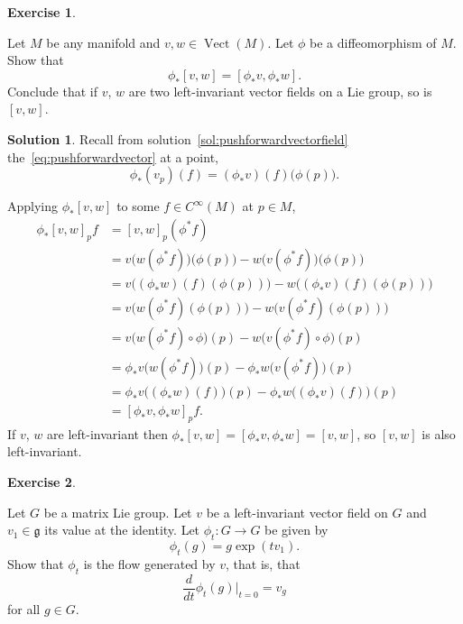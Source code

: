\documentclass[11pt, a4paper]{report}
\theoremstyle{definition}
\newtheorem{exercise}{Exercise}[part]
\newtheorem{solution}{Solution}[part]
\newenvironment{ex}{\begin{exercise}}{\end{exercise}\pagebreak[1]}
\newenvironment{sol}{\begin{solution}}{\end{solution}\pagebreak[3]}
\DeclareMathOperator{\Vect}{Vect}
\begin{document}
\begin{ex}\label{ex:pushforwardliebracket}

Let $M$ be any manifold and $v, w \in \Vect(M)$. Let $\phi$ be a diffeomorphism of $M$. Show that
\[
    \phi_* [v, w] = [\phi_* v, \phi_* w].
\]
Conclude that if $v$, $w$ are two left-invariant vector fields on a Lie group, so is $[v, w]$.

\end{ex}

\begin{sol}

Recall from solution~\ref{sol:pushforwardvectorfield} the~\ref{eq:pushforwardvector} at a point,
\[
    \phi_* (v_p) (f) = (\phi_* v)(f) \bigl(\phi(p)\bigr).
\]

Applying $\phi_* [v, w]$ to some $f \in C^\infty(M)$ at $p \in M$,
\begin{align*}
    \phi_* {[v, w]}_p f &= {[v, w]}_p (\phi^* f) \\
        &= v \bigl(w (\phi^* f) \bigr) \bigl(\phi(p)\bigr)
           - w \bigl(v (\phi^* f) \bigr) \bigl(\phi(p)\bigr) \\
        &= v \bigl( (\phi_* w) (f) (\phi(p)) \bigr)
           - w \bigl( (\phi_* v) (f) (\phi(p)) \bigr) \\
        &= v \bigl( w(\phi^* f) (\phi(p)) \bigr)
           - w \bigl( v(\phi^* f) (\phi(p)) \bigr) \\
        &= v \bigl( w(\phi^* f) \circ \phi \bigr) (p)
           - w \bigl( v(\phi^* f) \circ \phi \bigr) (p) \\
        &= \phi_* v \bigl( w(\phi^* f) \bigr) (p)
           - \phi_* w \bigl( v(\phi^* f) \bigr) (p) \\
        &= \phi_* v \bigl( (\phi_* w) (f) \bigr) (p)
           - \phi_* w \bigl( (\phi_* v) (f) \bigr) (p) \\
        &= {[\phi_* v, \phi_* w]}_p f.
\end{align*}
If $v$, $w$ are left-invariant then $\phi_* [v, w] = [\phi_* v, \phi_* w] = [v, w]$, so $[v, w]$ is also left-invariant.

\end{sol}

\begin{ex}\label{ex:liealgebraflow}

Let $G$ be a matrix Lie group.
Let $v$ be a left-invariant vector field on $G$ and $v_1 \in \mathfrak{g}$ its value at the identity.
Let $\phi_t: G \to G$ be given by
\[
    \phi_t(g) = g \exp(tv_1).
\]
Show that $\phi_t$ is the flow generated by $v$, that is, that
\[
    \frac{d}{dt} \phi_t(g) \Big|_{t = 0} = v_g
\]
for all $g \in G$.

\end{ex}
\end{document}
